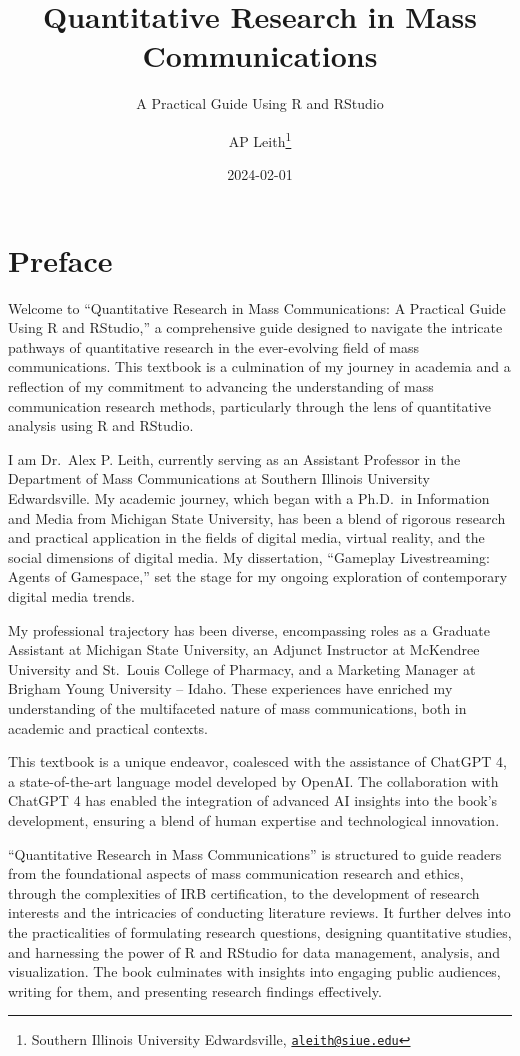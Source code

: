 \documentclass[
]{book}
\title{Quantitative Research in Mass Communications}
\subtitle{A Practical Guide Using R and RStudio}
\author{AP Leith\footnote{Southern Illinois University Edwardsville, \href{mailto:aleith@siue.edu}{\nolinkurl{aleith@siue.edu}}}}
\date{2024-02-01}
\begin{document}
\maketitle

{
\setcounter{tocdepth}{1}
\tableofcontents
}
\hypertarget{preface}{%
\chapter*{Preface}\label{preface}}

Welcome to ``Quantitative Research in Mass Communications: A Practical Guide Using R and RStudio,'' a comprehensive guide designed to navigate the intricate pathways of quantitative research in the ever-evolving field of mass communications. This textbook is a culmination of my journey in academia and a reflection of my commitment to advancing the understanding of mass communication research methods, particularly through the lens of quantitative analysis using R and RStudio.

I am Dr.~Alex P. Leith, currently serving as an Assistant Professor in the Department of Mass Communications at Southern Illinois University Edwardsville. My academic journey, which began with a Ph.D.~in Information and Media from Michigan State University, has been a blend of rigorous research and practical application in the fields of digital media, virtual reality, and the social dimensions of digital media. My dissertation, ``Gameplay Livestreaming: Agents of Gamespace,'' set the stage for my ongoing exploration of contemporary digital media trends.

My professional trajectory has been diverse, encompassing roles as a Graduate Assistant at Michigan State University, an Adjunct Instructor at McKendree University and St.~Louis College of Pharmacy, and a Marketing Manager at Brigham Young University -- Idaho. These experiences have enriched my understanding of the multifaceted nature of mass communications, both in academic and practical contexts.

This textbook is a unique endeavor, coalesced with the assistance of ChatGPT 4, a state-of-the-art language model developed by OpenAI. The collaboration with ChatGPT 4 has enabled the integration of advanced AI insights into the book's development, ensuring a blend of human expertise and technological innovation.

``Quantitative Research in Mass Communications'' is structured to guide readers from the foundational aspects of mass communication research and ethics, through the complexities of IRB certification, to the development of research interests and the intricacies of conducting literature reviews. It further delves into the practicalities of formulating research questions, designing quantitative studies, and harnessing the power of R and RStudio for data management, analysis, and visualization. The book culminates with insights into engaging public audiences, writing for them, and presenting research findings effectively.
\end{document}
